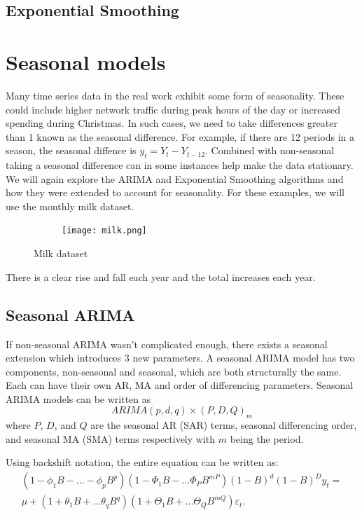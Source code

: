 \documentclass{article}
\begin{document}
  \subsection{Exponential Smoothing}
  
  \section{Seasonal models}
  Many time series data in the real work exhibit some form of seasonality. These could include higher network traffic during peak hours of the day or increased spending during Christmas. In such cases, we need to take differences greater than 1 known as the seasonal difference. For example, if there are 12 periods in a season, the seasonal diffence is $y_t = Y_t - Y_{t-12}$. Combined with non-seasonal taking a seasonal difference can in some instances help make the data stationary. We will again explore the ARIMA and Exponential Smoothing algorithms and how they were extended to account for seasonality. For these examples, we will use the monthly milk dataset.
  \begin{figure}[H]
    \centering
    \captionsetup{justification=centering}
    \begin{subfigure}[b]{\linewidth}
      \texttt{[image: milk.png]}
    \end{subfigure}
    \caption{Milk dataset}
  \end{figure}

  There is a clear rise and fall each year and the total increases each year.

  \subsection{Seasonal ARIMA}
  If non-seasonal ARIMA wasn't complicated enough, there exists a seasonal extension which introduces 3 new parameters. A seasonal ARIMA model has two components, non-seasonal and seasonal, which are both structurally the same. Each can have their own AR, MA and order of differencing parameters. Seasonal ARIMA models can be written as 
  \begin{equation*}
    ARIMA(p,d,q)\times(P,D,Q)_m
  \end{equation*}
  where $P$, $D$, and $Q$ are the seasonal AR (SAR) terms, seasonal differencing order, and seasonal MA (SMA) terms respectively with $m$ being the period.

  Using backshift notation, the entire equation can be written as:
  \begin{equation*}
    \begin{split}
      (1 - \phi_1B - ... - \phi_pB^p)(1 - \Phi_1B - ... \Phi_PB^{mP})(1 - B)^d(1 - B)^D y_t = \\
      \mu + (1 + \theta_1B + ... \theta_qB^q)(1 + \Theta_1B + ... \Theta_QB^{mQ})\varepsilon_t.
    \end{split}
  \end{equation*}
\end{document}
